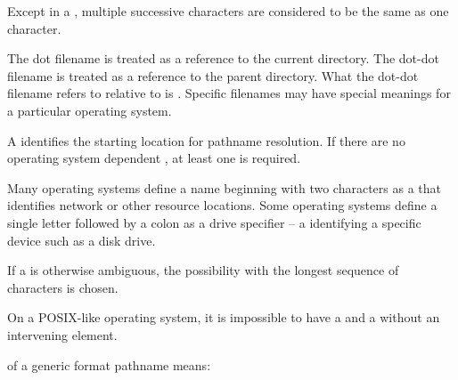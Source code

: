 \pnum
Except in a ,
multiple successive  characters are considered to
be the same as one  character.

\pnum
The dot filename is treated as a reference to the current directory.
The dot-dot filename is treated as a reference to the parent directory.
What the dot-dot filename refers to
relative to  is .
Specific filenames may have special meanings for a particular operating system.

\pnum
A  identifies the
starting location for pathname resolution.
If there are no operating system dependent ,
at least one \impldefrootname{}  is required.
\begin{note}
Many operating systems define a name
beginning with two  characters
as a  that identifies
network or other resource locations.
Some operating systems
define a single letter followed by a colon
as a drive specifier -- a 
identifying a specific device such as a disk drive.
\end{note}

\pnum
If a  is otherwise ambiguous,
the possibility with the longest sequence of characters is chosen.
\begin{note}
On a POSIX-like operating system, it is impossible to have a
 and a 
without an intervening  element.
\end{note}

\pnum
{}%
 of a generic format pathname means:

